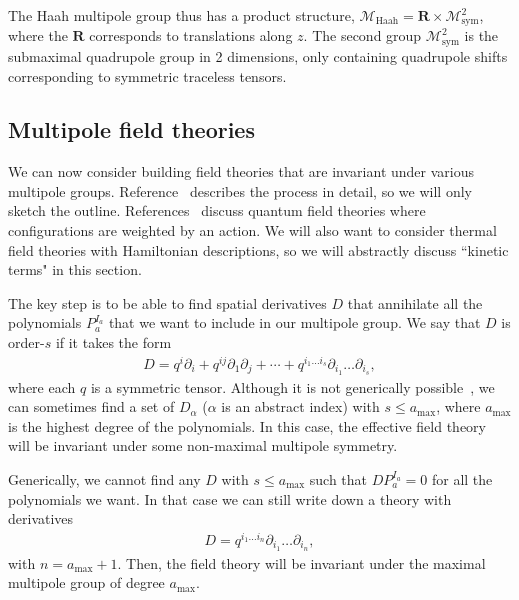 \documentclass[pra,aps,twocolumn, amsfonts,amsmath,amssymb,nofootinbib,superscriptaddress]{revtex4}
\begin{document}
The Haah multipole group thus has a product structure, $\mathcal{M}_\text{Haah} = \mathbf{R} \times \mathcal{M}^2_\text{sym}$, where the $\mathbf{R}$ corresponds to translations along $z$. The second group $\mathcal{M}^2_\text{sym}$ is the submaximal quadrupole group in 2 dimensions, only containing quadrupole shifts corresponding to symmetric traceless tensors.

\subsection{Multipole field theories} \label{sub:field}

We can now consider building field theories that are invariant under various multipole groups. Reference~\cite{Gromov2019} describes the process in detail, so we will only sketch the outline. References~\cite{Griffin2015, Gromov2019} discuss quantum field theories where configurations are weighted by an action. We will also want to consider thermal field theories with Hamiltonian descriptions, so we will abstractly discuss ``kinetic terms" in this section.

The key step is to be able to find spatial derivatives $D$ that annihilate all the polynomials $P_a^{I_a}$ that we want to include in our multipole group. We say that $D$ is order-$s$ if it takes the form
\begin{align}
D = q^i\partial_i + q^{ij}\partial_1\partial_j + \cdots + q^{i_1\dots i_s}\partial_{i_1}\dots\partial_{i_s},
\end{align}
where each $q$ is a symmetric tensor. Although it is not generically possible~\cite{Gromov2019}, we can sometimes find a set of $D_\alpha$ ($\alpha$ is an abstract index) with $s\le a_{\text{max}}$, where $a_\text{max}$ is the highest degree of the polynomials. In this case, the effective field theory will be invariant under some non-maximal multipole symmetry. 

Generically, we cannot find any $D$ with $s\le a_\text{max}$ such that $DP_a^{I_a} = 0$ for all the polynomials we want. In that case we can still write down a theory with derivatives 
\begin{align}
D = q^{i_1\dots i_n}\partial_{i_1}\dots \partial_{i_n},
\end{align}
with $n=a_\text{max}+1$. Then, the field theory will be invariant under the maximal multipole group of degree $a_\text{max}$. 
\end{document}
